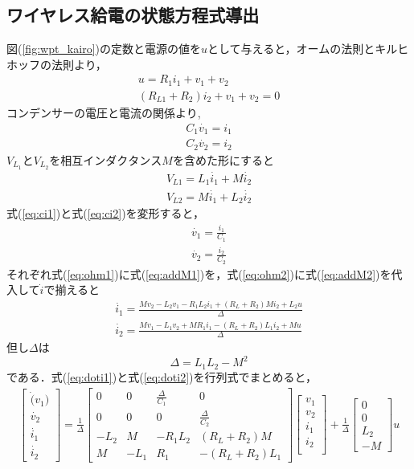 \documentclass[12pt]{jarticle}
\begin{document}
\subsection{ワイヤレス給電の状態方程式導出}
図(\ref{fig:wpt_kairo})の定数と電源の値を$u$として与えると，オームの法則とキルヒホッフの法則より，
\setcounter{equation}{0}
\begin{eqnarray}
\label{eq:ohm1}
u=R_1i_1+v_1+v_2\\
\label{eq:ohm2}
(R_{L1}+R_2)i_2+v_1+v_2=0
\end{eqnarray}
 コンデンサーの電圧と電流の関係より,
\begin{eqnarray}
\label{eq:ci1}
C_1\dot{v_1}=i_1\\
\label{eq:ci2}
C_2\dot{v_2}=i_2
\end{eqnarray}
$V_{L_1}とV_{L_2}を相互インダクタンスMを含めた形にすると$
\begin{eqnarray}
\label{eq:addM1}
V_{L1}=L_1\dot{i_1}+M\dot{i_2}\\
\label{eq:addM2}
V_{L2}=M\dot{i_1}+L_2\dot{i_2}
\end{eqnarray}
式(\ref{eq:ci1})と式(\ref{eq:ci2})を変形すると，
\begin{eqnarray}
\dot{v_1}=\frac{i_1}{C_1}\\
\dot{v_2}=\frac{i_2}{C_2}
\end{eqnarray}
それぞれ式(\ref{eq:ohm1})に式(\ref{eq:addM1})を，式(\ref{eq:ohm2})に式(\ref{eq:addM2})を代入して$\dot{i}$で揃えると
\begin{eqnarray}
\label{eq:doti1}
\dot{i_1}=\frac{Mv_2-L_2v_1-R_1L_2i_1+(R_L+R_2)Mi_2+L_2u}{\Delta}\\
\label{eq:doti2}
\dot{i_2}=\frac{Mv_1-L_1v_2+MR_1i_1-(R_L+R_2)L_1i_2+Mu}{\Delta}
\end{eqnarray}
$但し\Delta は$
\begin{equation}
\Delta=L_1L_2-M^2\nonumber
\end{equation}
である．式(\ref{eq:doti1})と式(\ref{eq:doti2})を行列式でまとめると，
\begin{eqnarray}
\begin{bmatrix}
\dot(v_1)\\
\dot{v_2}\\
\dot{i_1}\\
\dot{i_2}
\end{bmatrix}
=\frac{1}{\Delta}
\begin{bmatrix}
0 & 0 & \frac{\Delta}{C_1} & 0 \\
0 & 0 & 0 & \frac{\Delta}{C_2} \\
-L_2 & M & -R_1L_2 & (R_L+R_2)M \\
M & -L_1 & R_1 & -(R_L+R_2)L_1
\end{bmatrix}
\begin{bmatrix}
v_1\\
v_2\\
i_1\\
i_2\\
\end{bmatrix}
+\frac{1}{\Delta}
\begin{bmatrix}
0\\
0\\
L_2\\
-M
\end{bmatrix}
u
\end{eqnarray}
\end{document}
